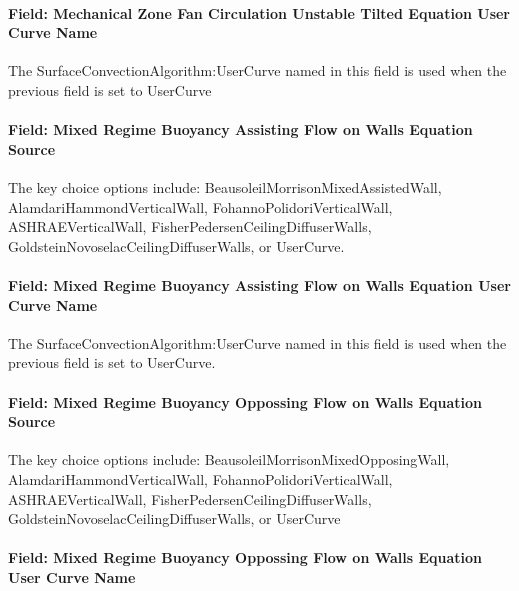 \paragraph{Field: Mechanical Zone Fan Circulation Unstable Tilted Equation User Curve Name}\label{field-mechanical-zone-fan-circulation-unstable-tilted-equation-user-curve-name-1}

The SurfaceConvectionAlgorithm:UserCurve named in this field is used when the previous field is set to UserCurve

\paragraph{Field: Mixed Regime Buoyancy Assisting Flow on Walls Equation Source}\label{field-mixed-regime-buoyancy-assisting-flow-on-walls-equation-source}

The key choice options include: BeausoleilMorrisonMixedAssistedWall, AlamdariHammondVerticalWall, FohannoPolidoriVerticalWall, ASHRAEVerticalWall, FisherPedersenCeilingDiffuserWalls, GoldsteinNovoselacCeilingDiffuserWalls, or UserCurve.

\paragraph{Field: Mixed Regime Buoyancy Assisting Flow on Walls Equation User Curve Name}\label{field-mixed-regime-buoyancy-assisting-flow-on-walls-equation-user-curve-name}

The SurfaceConvectionAlgorithm:UserCurve named in this field is used when the previous field is set to UserCurve.

\paragraph{Field: Mixed Regime Buoyancy Oppossing Flow on Walls Equation Source}\label{field-mixed-regime-buoyancy-oppossing-flow-on-walls-equation-source}

The key choice options include: BeausoleilMorrisonMixedOpposingWall, AlamdariHammondVerticalWall, FohannoPolidoriVerticalWall, ASHRAEVerticalWall, FisherPedersenCeilingDiffuserWalls, GoldsteinNovoselacCeilingDiffuserWalls, or UserCurve

\paragraph{Field: Mixed Regime Buoyancy Oppossing Flow on Walls Equation User Curve Name}\label{field-mixed-regime-buoyancy-oppossing-flow-on-walls-equation-user-curve-name}

